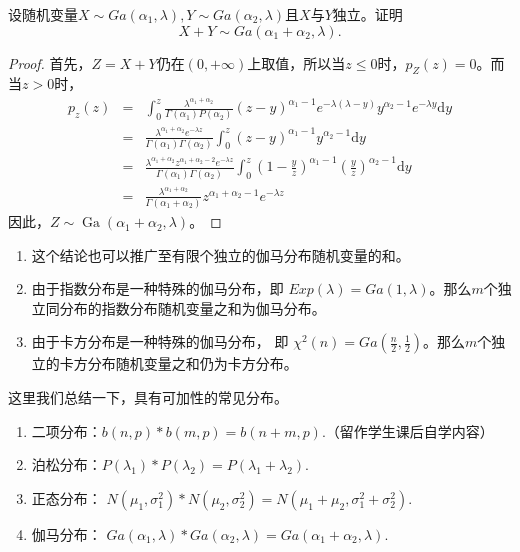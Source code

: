 \begin{example}
    设随机变量$X \sim Ga\left(\alpha_{1}, \lambda\right), Y \sim Ga\left(\alpha_{2}, \lambda\right) $且$X$与$Y$独立。证明$$ X+Y \sim Ga\left(\alpha_{1}+\alpha_{2}, \lambda\right).$$
\end{example}
\begin{proof}
 首先，$Z=X+Y$仍在$(0,+\infty)$上取值，所以当$z \leqslant 0$时，$p_Z(z)=0$。而当$z>0$时，
 \begin{eqnarray*}
     p_{z}(z) &=&\int_{0}^{z} \frac{\lambda^{\alpha_{1}+\alpha_{2}}}{\Gamma\left(\alpha_{1}\right) P\left(\alpha_{2}\right)}(z-y)^{\alpha_{1}-1} e^{-\lambda(\lambda-y)} y^{\alpha_{2}-1} e^{-\lambda y} \text{d} y \\
&=&\frac{\lambda^{\alpha_{1}+\alpha_{2}} e^{-\lambda z}}{\Gamma\left(\alpha_{1}\right) \Gamma\left(\alpha_{2}\right)} \int_{0}^{z}(z-y)^{\alpha_{1}-1} y^{\alpha_{2}-1} \text{d} y \\
&=&\frac{\lambda^{\alpha_{1}+\alpha_{2}} z^{\alpha_{1}+\alpha_{2}-2} e^{-\lambda z}}{\Gamma\left(\alpha_{1}\right) \Gamma\left(\alpha_{2}\right)} \int_{0}^{z}\left(1-\frac{y}{z}\right)^{\alpha_{1}-1}\left(\frac{y}{z}\right)^{\alpha_{2}-1} \text{d} y \\
&=&\frac{\lambda^{\alpha_{1}+\alpha_{2}}}{\Gamma\left(\alpha_{1}+\alpha_{2}\right)} z^{\alpha_{1}+\alpha_{2}-1} e^{-\lambda z}
 \end{eqnarray*}
因此，$Z \sim \operatorname{Ga}\left(\alpha_{1}+\alpha_{2}, \lambda\right)$。
\end{proof}

\begin{remark}
    \begin{enumerate}
        \item 这个结论也可以推广至有限个独立的伽马分布随机变量的和。
        \item 由于指数分布是一种特殊的伽马分布，即 $Exp(\lambda) = Ga(1,\lambda)$。那么$m$个独立同分布的指数分布随机变量之和为伽马分布。
        \item 由于卡方分布是一种特殊的伽马分布，
        即 $\chi^2(n) = Ga\left(\frac{n}{2},\frac{1}{2}\right)$。那么$m$个独立的卡方分布随机变量之和仍为卡方分布。
    \end{enumerate}
\end{remark}

\begin{conclusion}
    这里我们总结一下，具有可加性的常见分布。
    \begin{enumerate}
    \item 二项分布：$b(n,p) * b(m,p) = b(n+m,p)$.（留作学生课后自学内容）
    \item 泊松分布：$P(\lambda_1)*P(\lambda_2) = P(\lambda_1+\lambda_2)$.
     \item 正态分布：
    $N(\mu_1,\sigma_1^2) * N(\mu_2,\sigma_2^2) = N(\mu_1+\mu_2, \sigma_1^2 + \sigma_2^2) $.
    \item 伽马分布：
    $Ga(\alpha_1,\lambda) * Ga(\alpha_2,\lambda) = Ga(\alpha_1+\alpha_2,\lambda) $.
    \end{enumerate}
\end{conclusion}
    
